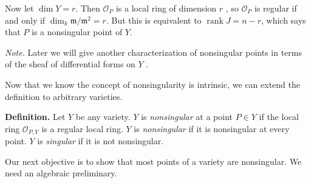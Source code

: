 {Now let $\dim Y=r$. Then $\mathcal O_P$ is a local ring of dimension $r$ , so $\mathcal O_P$ is regular if and only if $\dim_k\mathfrak m/\mathfrak m^2=r$. But this is equivalent to $\operatorname{rank}J=n-r$, which says that $P$ is a nonsingular point of $Y$.

\emph{Note.} Later we will give another characterization of nonsingular points in terms of the sheaf of differential forms on $Y$ .

\smallskip
Now that we know the concept of nonsingularity is intrinsic, we can extend the definition to arbitrary varieties.

\smallskip
\noindent\textbf{Definition.} Let $Y$ be any variety. $Y$ is \emph{nonsingular} at a point $P\in Y$ if the local ring $\mathcal O_{P,Y}$ is a regular local ring. $Y$ is \emph{nonsingular} if it is nonsingular at every point. $Y$ is \emph{singular} if it is not nonsingular.

\smallskip
Our next objective is to show that most points of a variety are nonsingular. We need an algebraic preliminary.}
